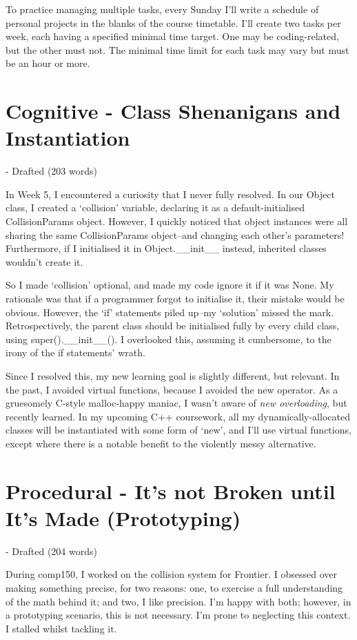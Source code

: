 \documentclass{scrartcl}
\begin{document}
To practice managing multiple tasks, every Sunday I'll write a schedule of personal projects in the blanks of the course timetable. I'll create two tasks per week, each having a specified minimal time target. One may be coding-related, but the other must not. The minimal time limit for each task may vary but must be an hour or more.

\section{Cognitive - Class Shenanigans and Instantiation} - Drafted (203 words)

In Week 5, I encountered a curiosity that I never fully resolved. In our Object class, I created a `collision' variable, declaring it as a default-initialised CollisionParams object. However, I quickly noticed that object instances were all sharing the same CollisionParams object--and changing each other's parameters! Furthermore, if I initialised it in Object.__init__ instead, inherited classes wouldn't create it.

So I made `collision' optional, and made my code ignore it if it was None. My rationale was that if a programmer forgot to initialise it, their mistake would be obvious. However, the `if' statements piled up--my `solution' missed the mark. Retrospectively, the parent class should be initialised fully by every child class, using super().__init__(). I overlooked this, assuming it cumbersome, to the irony of the if statements' wrath.

Since I resolved this, my new learning goal is slightly different, but relevant. In the past, I avoided virtual functions, because I avoided the new operator. As a gruesomely C-style malloc-happy maniac, I wasn't aware of \textit{new overloading}, but recently learned. In my upcoming C++ coursework, all my dynamically-allocated classes will be instantiated with some form of `new', and I'll use virtual functions, except where there is a notable benefit to the violently messy alternative.

\section{Procedural - It's not Broken until It's Made (Prototyping)} - Drafted (204 words)

During comp150, I worked on the collision system for Frontier. I obsessed over making something precise, for two reasons: one, to exercise a full understanding of the math behind it; and two, I like precision. I'm happy with both; however, in a prototyping scenario, this is not necessary. I'm prone to neglecting this context. I stalled whilst tackling it.
\end{document}
